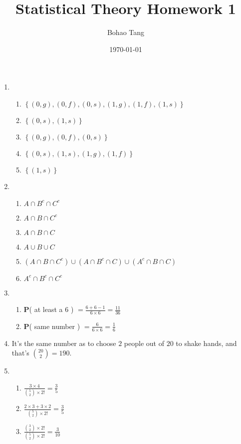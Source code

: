 \documentclass[12pt]{article}
\title{Statistical Theory Homework 1}
\date{\today}
\author{Bohao Tang}
\begin{document}
\maketitle

\begin{enumerate}
    \item
    \begin{enumerate}
        \item $\left\{ (0,g),(0,f),(0,s),(1,g),(1,f),(1,s) \right\}$
        \item $\left\{ (0,s),(1,s) \right\}$
        \item $\left\{ (0,g),(0,f),(0,s) \right\}$
        \item $\left\{ (0,s),(1,s),(1,g),(1,f) \right\}$
        \item $\left\{ (1,s) \right\}$
    \end{enumerate}
    \item 
    \begin{enumerate}
        \item $A \cap B^c \cap C^c$
        \item $A \cap B \cap C^c$
        \item $A \cap B \cap C$
        \item $A \cup B \cup C$
        \item $(A \cap B \cap C^c) \cup (A \cap B^c \cap C) \cup (A^c \cap B \cap C)$
        \item $A^c \cap B^c \cap C^c$        
    \end{enumerate}
    \item 
    \begin{enumerate}
        \item $\textbf{P}$( at least a 6 ) $= \frac{6 + 6 - 1}{6 \times 6} = \frac{11}{36}$
        \item $\textbf{P}$( same number ) $= \frac{6}{6 \times 6} = \frac{1}{6}$ 
    \end{enumerate}
    \item 
    It's the same number as to choose $2$ people out of $20$ to shake hands, and that's $\binom{20}{2} = 190$.
    \item
    \begin{enumerate}
        \item $\frac{3 \times 4}{\binom{5}{2} \times 2 !} = \frac{3}{5}$
        \item $\frac{2 \times 3 + 3 \times 2}{\binom{5}{2} \times 2 !} = \frac{3}{5}$
        \item $\frac{\binom{3}{2} \times 2 !}{\binom{5}{2} \times 2 !} = \frac{3}{10}$

\end{enumerate}
\end{enumerate}
\end{document}

